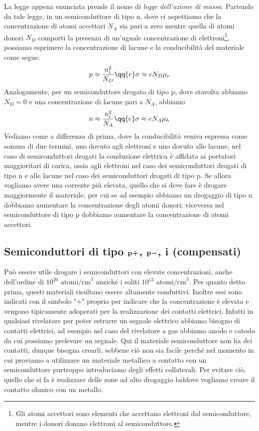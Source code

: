 La legge appena enunciata prende il nome di \textit{legge dell'azione di massa}. Partendo da tale legge, in un semiconduttore di tipo n, dove ci aspettiamo che la concentrazione di atomi accettori $N_A$ sia pari a zero mentre quella di atomi donori $N_D$ comporti la presenza di un'uguale concentrazione di elettroni\footnote{Gli atomi accettori sono elementi che accettano elettroni dal semiconduttore, mentre i donori donano elettroni al semiconduttore.}, possiamo esprimere la concentrazione di lacune e la conducibilità del materiale come segue:
\begin{equation*}
   p \approx \frac{n_i^2}{N_D}
   \qq{e}
   \sigma \approx e N_D \mu_e
\end{equation*}
Analogamente, per un semiconduttore drogato di tipo p, dove stavolta abbiamo $N_D=0$ e una concentrazione di lacune pari a $N_A$, abbiamo 
\begin{equation*}
   n \approx \frac{n_i^2}{N_A}
   \qq{e}
   \sigma \approx e N_A \mu_h
\end{equation*}
Vediamo come a differenza di prima, dove la conducibilità veniva espressa come somma di due termini, uno dovuto agli elettroni e uno dovuto alle lacune, nel caso di semiconduttori drogati la conduzione elettrica è affidata ai portatori maggioritari di carica, ossia agli elettroni nel caso dei semiconduttori drogati di tipo n e alle lacune nel caso dei semiconduttori drogati di tipo p. Se allora vogliamo avere una corrente più elevata, quello che si deve fare è drogare maggiormente il materiale, per cui se ad esempio abbiamo un drogaggio di tipo n dobbiamo aumentare la concentrazione degli atomi donori; viceversa nel semiconduttore di tipo p dobbiamo aumentare la concentrazione di atomi accettori.

\subsection[Semiconduttori di tipo \texorpdfstring{$\rm p+$}{p+}, \texorpdfstring{$\rm p-$}{p-}, i (compensati)]
{Semiconduttori di tipo $\boldsymbol{\rm p+}$, $\boldsymbol{\rm p-}$, i (compensati)}
Può essere utile drogare i semiconduttori con elevate concentrazioni, anche dell'ordine di $10^{20}\text{ atomi/cm}^3$ anziché i soliti $10^{13}\text{ atomi/cm}^3$. Per quanto detto prima, questi materiali risultano essere altamente conduttivi. Inoltre essi sono indicati con il simbolo "$+$" proprio per indicare che la concentrazione è elevata e vengono tipicamente adoperati per la realizzazione dei contatti elettrici. Infatti in qualsiasi rivelatore per poter estrarre un segnale elettrico abbiamo bisogno di contatti elettrici, ad esempio nel caso del rivelatore a gas abbiamo anodo e catodo da cui possiamo prelevare un segnale. Qui il materiale semiconduttore non ha dei contatti, dunque bisogna crearli, sebbene ciò non sia facile perché nel momento in cui proviamo a utilizzare un materiale metallico a contatto con un semiconduttore purtroppo introduciamo degli effetti collaterali. Per evitare ciò, quello che si fa è realizzare delle zone ad alto drogaggio laddove vogliamo creare il contatto ohmico con un metallo.

